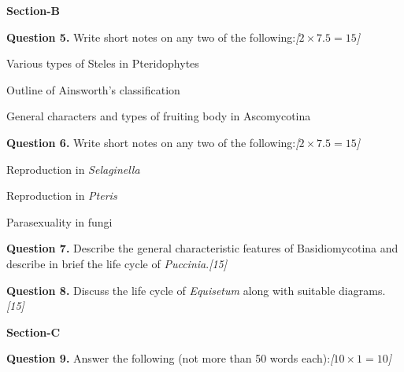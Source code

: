 \documentclass[11pt,a4paper]{article}
\newcommand{\pts}[1]{\hfill   \textit{[#1]}}
\begin{document}
\bigskip

\begin{center}
   \textbf{Section-B}
\end{center}
\medskip

\medskip


\noindent   \textbf{Question 5.} Write short notes on any two of the following:\pts{$2  \times 7.5 = 15$}

\begin{parts}
  \item Various types of Steles in Pteridophytes
  \item Outline of Ainsworth's classification
  \item General characters and types of fruiting body in Ascomycotina
\end{parts}

\medskip


\noindent   \textbf{Question 6.} Write short notes on any two of the following:\pts{$2  \times 7.5 = 15$}

\begin{parts}
  \item Reproduction in   \textit{Selaginella}
  \item Reproduction in   \textit{Pteris}
  \item Parasexuality in fungi
\end{parts}

\medskip


\noindent   \textbf{Question 7.} Describe the general characteristic features of Basidiomycotina and describe in brief the life cycle of   \textit{Puccinia}.\pts{15}

\medskip


\noindent   \textbf{Question 8.} Discuss the life cycle of   \textit{Equisetum} along with suitable diagrams.\pts{15}

\bigskip

\begin{center}
   \textbf{Section-C}
\end{center}
\medskip

\medskip


\noindent   \textbf{Question 9.} Answer the following (not more than 50 words each):\pts{$10  \times 1 = 10$}
\end{document}
